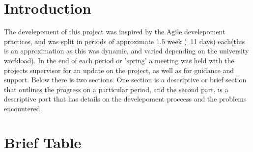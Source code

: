 \documentclass[a4paper,11pt,oneside]{book}
\begin{document}
	\section{Introduction}
	The develepoment of this project was inspired by the Agile develepoment practices, and was split in periods of approximate 1.5 week (~11 days) each(this is an
	approximation as this was dynamic, and varied depending on the university workload). In the end of each period or 'spring' a meeting was held with the projects supervisor for
	an update on the project, as well as for guidance and support. Below there is two sections. One section is a descriptive or brief section that outlines the progress on a particular
	period, and the second part, is a descriptive part that has details on the develepoment proccess and the problems encountered.
	\section{Brief Table}
\end{document}
